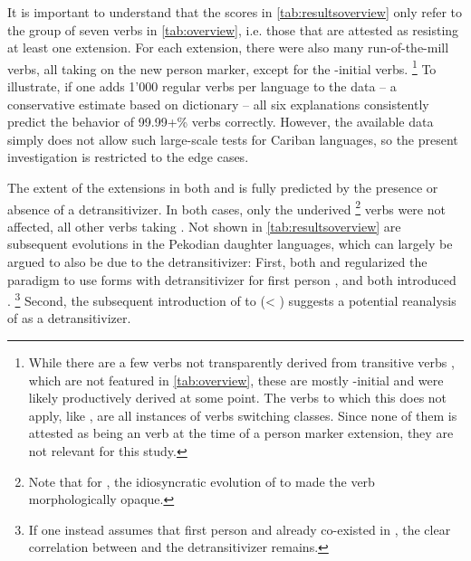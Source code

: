 





It is important to understand that the scores in \cref{tab:resultsoverview} only refer to the group of seven verbs in \cref{tab:overview}, i.e. those that are attested as resisting at least one extension.
For each extension, there were also many run-of-the-mill  verbs, all taking on the new person marker, except for the \akuriyo {}-initial verbs.%
\footnote{While there are a few  verbs not transparently derived from transitive verbs \parencites[252]{triomeira1999}[222]{meira2000split}[30]{gildea2007greenberg}, which are not featured in \cref{tab:overview}, these are mostly -initial and were likely productively derived at some point.
	The verbs to which this does not apply, like \trio {}  \parencites[252]{triomeira1999}, are all instances of  verbs switching classes.
	Since none of them is attested as being an  verb at the time of a person marker extension, they are not relevant for this study.}
To illustrate, if one adds 1'000 regular  verbs per language to the data -- a conservative estimate based on  \kalina dictionary -- all six explanations consistently predict the behavior of 99.99+\% verbs correctly.
However, the available data simply does not allow such large-scale tests for Cariban languages, so the present investigation is restricted to the edge cases.

The extent of the extensions in both \PWai and \PPek is fully predicted by the presence or absence of a detransitivizer.
In both cases, only the underived%
\footnote{Note that for \PPek, the idiosyncratic evolution of   to   made the verb morphologically opaque.}
 verbs were not affected, all other  verbs taking .
Not shown in \cref{tab:resultsoverview} are subsequent evolutions in the Pekodian daughter languages, which can largely be argued to also be due to the detransitivizer:
First, both \ikpeng and \bakairi regularized the paradigm to use forms with detransitivizer for first person , and both introduced .%
\footnote{If one instead assumes that first person  and  already co-existed in \PPek, the clear correlation between  and the detransitivizer remains.}
Second, the subsequent introduction of  to \ikpeng {}  (< ) suggests a potential reanalysis of  as a detransitivizer.

